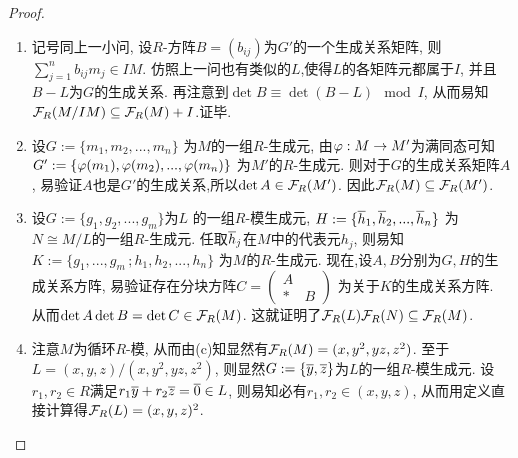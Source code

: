 \documentclass[oneside,a4papar,11pt,UTF8]{book}
\begin{document}
\begin{enumerate}[resume]
\begin{proof}
\begin{enumerate}
      另一方面,对任意$\olB=(\olb_{ij})$
      为关于$G'$的生成关系方阵,其矩阵元$\olb_{ij}\in R/I$.
      任取$b_{ij}\in R$为$\olb_{ij}$的一个代表元.
      则对于任意$1\leq i\leq n$,
      有$\sum_{j=1}^{n}b_{ij}m_j\in IM$.
      注意$IM$当中的元素必可以写成$\{m_1,m_2,...,m_n\}$的$I$-线性组合,
      因此存在$\lmd_{ij}\in I$使得
      \[\sum_{j=1}^{n}b_{ij}m_j=\sum_{j=1}^{n}\lmd_{ij}m_j\]
      这对任意$1\leq i,j\leq n$都成立.
      记方阵$L=(\lmd_{ij})$,
      则$B-L$为关于$G$的生成关系矩阵,
      并且易知$\det B\equiv\det (B-L)\mod I$.
      这就证明了$\mcalF_{R/I}(M/IM)\subseteq\overline{\mcalF_R(M)}$.
      综上证毕.

      \item 记号同上一小问,
      设$R$-方阵$B=(b_{ij})$为$G'$的一个生成关系矩阵,
      则$\sum_{j=1}^{n}b_{ij}m_j\in IM$.
      仿照上一问也有类似的$L$,使得$L$的各矩阵元都属于$I$,
      并且$B-L$为$G$的生成关系.
      再注意到$\det B\equiv\det(B-L)\mod I$,
      从而易知$\mathcal{F}_R(M/IM)\subseteq\mathcal{F}_R(M)+I$.证毕.

      \item 设$G:=\{m_1,m_2,...,m_n\}$
      为$M$的一组$R$-生成元,
      由$\varphi:M\to M'$为满同态可知
      $G':=\{\varphi(m_1),\varphi(m_2),...,\varphi(m_n)\}$
      为$M'$的$R$-生成元.
      则对于$G$的生成关系矩阵$A$,
      易验证$A$也是$G'$的生成关系,所以$\det A\in\mathcal{F}_R(M')$.
      因此$\mathcal{F}_R(M)\subseteq\mathcal{F}_R(M')$.

      \item 设$G:=\{g_1,g_2,...,g_m\}$为$L$
      的一组$R$-模生成元,
      $H:=\{\overline{h}_1,\overline{h}_2,...,\overline{h}_n\}$
      为$N\cong M/L$的一组$R$-生成元.
      任取$\overline{h}_j$在$M$中的代表元$h_j$,
      则易知$K:=\{g_1,...,g_m\,;h_1,h_2,...,h_n\}$
      为$M$的$R$-生成元.
      现在,设$A,B$分别为$G,H$的生成关系方阵,
      易验证存在分块方阵$C=
      \begin{pmatrix}
        A &   \\
        * & B
      \end{pmatrix}$
      为关于$K$的生成关系方阵.
      从而$\det A\det B=\det C\in\mathcal{F}_R(M)$.
      这就证明了$\mathcal{F}_R(L)\mathcal{F}_R(N)\subseteq\mathcal{F}_R(M)$.

      \item 注意$M$为循环$R$-模,
      从而由(c)知显然有$\mathcal{F}_R(M)=(x,y^2,yz,z^2)$.
      至于$L=(x,y,z)/(x,y^2,yz,z^2)$,
      则显然$G:=\{\overline{y},\overline{z}\}$为$L$的一组$R$-模生成元.
      设$r_1,r_2\in R$满足$r_1\overline{y}+r_2\overline{z}=\overline{0}\in L$,
      则易知必有$r_1,r_2\in(x,y,z)$,
      从而用定义直接计算得$\mathcal{F}_R(L)=(x,y,z)^2$.


\end{enumerate}
\end{proof}
\end{enumerate}
\end{document}
